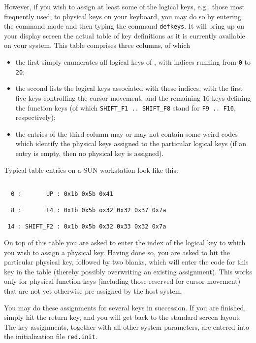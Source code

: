 However, if you wish to assign at least some of the logical keys, e.g.,
those most frequently used, to physical keys on your keyboard, you may
do so by entering the command mode and then typing the command 
{\tt defkeys}. It will bring up on your display screen the actual table
of {\mys key definitions} as it is currently available on your system.
This table comprises three columns, of which 
\begin{itemize} 
\item the first simply enumerates all logical keys of \pired, with
indices running from {\tt 0} to {\tt 20};
\item the second lists the logical keys associated with these indices,
with the first five keys controlling the cursor movement, and the 
remaining 16 keys defining the function keys (of which {\tt SHIFT\_F1
.. SHIFT\_F8} stand for {\tt F9 .. F16}, respectively);
\item the entries of the third column may or may not 
contain some weird codes which identify the physical keys assigned
 to the particular logical keys (if an entry is empty, then no
physical key is assigned).
\end{itemize}
Typical table entries on a SUN workstation look like this:
\begin{verbatim}

  0 :       UP : 0x1b 0x5b 0x41

  8 :       F4 : 0x1b 0x5b ox32 0x32 0x37 0x7a

 14 : SHIFT_F2 : 0x1b 0x5b 0x32 0x33 0x32 0x7a

\end{verbatim}
 
On top of this table you are asked to enter the index of the logical
key to which you wish to assign a physical key. Having done so,
you are asked to hit the particular physical key, followed by two 
blanks, which will enter the code for this key in the table (thereby
 possibly overwriting an existing assignment). This works only for
physical function keys (including those reserved for cursor movement)
that are not yet otherwise pre-assigned by the host system.

 You may
do these assignments for several keys in succession. If you are
 finished, 
simply hit the return key, and you will get back to the standard
\pired screen layout. The key assignments, together with all other
system parameters,  are entered into the \pired 
{\mys initialization file} {\tt red.init}. 

